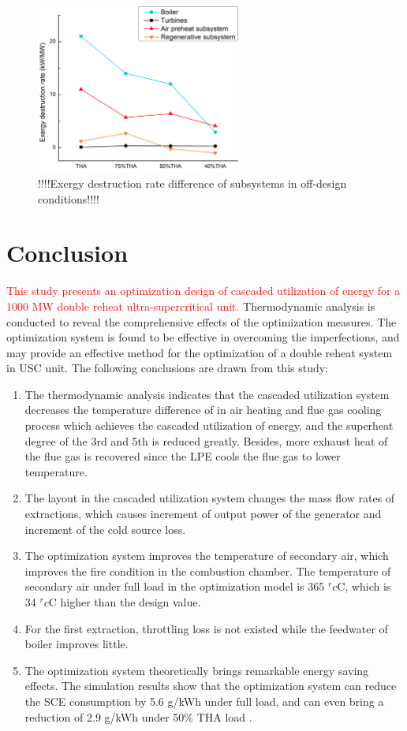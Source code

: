 \documentclass[preprint,12pt]{elsarticle}
\begin{document}
\begin{figure}[htbp]
\centering
\includegraphics[width=0.6\textwidth]{fig/partload_subsys_exergyrate.png}
\caption{!!!!Exergy destruction rate difference of subsystems in off-design conditions!!!!} 
\label{fig:partload_subsys_exergyrate}
\end{figure}


\section{Conclusion}
\textcolor{red}{This study presents an optimization design of cascaded utilization of energy for a 1000 MW double reheat ultra-supercritical unit.}
Thermodynamic analysis is conducted to reveal the comprehensive effects of the optimization measures. 
The optimization system is found to be effective in overcoming the imperfections, and may provide an effective method for the optimization of a double reheat system in USC unit.
The following conclusions are drawn from this study: 
 \begin{enumerate}[(1)]
\item The thermodynamic analysis indicates that the cascaded utilization system decreases the temperature difference of in air heating and flue gas cooling process which achieves the cascaded utilization of energy, and the superheat degree of the 3rd and 5th is reduced greatly. 
Besides, more exhaust heat of the flue gas is recovered since the LPE cools the flue gas to lower temperature. 
\item The layout in the cascaded utilization system changes the mass flow rates of extractions, which causes increment of output power of the generator and increment of the cold source loss.
\item The optimization system improves the temperature of secondary air, which improves the fire condition in the combustion chamber.
 The temperature of secondary air under full load in the optimization model is 365 $^	rc$C, which is 34 $^	rc$C higher than the design value.
\item For the first extraction, throttling loss is not existed while the feedwater of boiler improves little.  
\item The optimization system theoretically brings remarkable energy saving effects. The simulation results show that the optimization system can reduce the SCE consumption by 5.6 g/kWh under full load, and can even bring a reduction of 2.9 g/kWh under 50\% THA load .
\end{enumerate}
\end{document}
